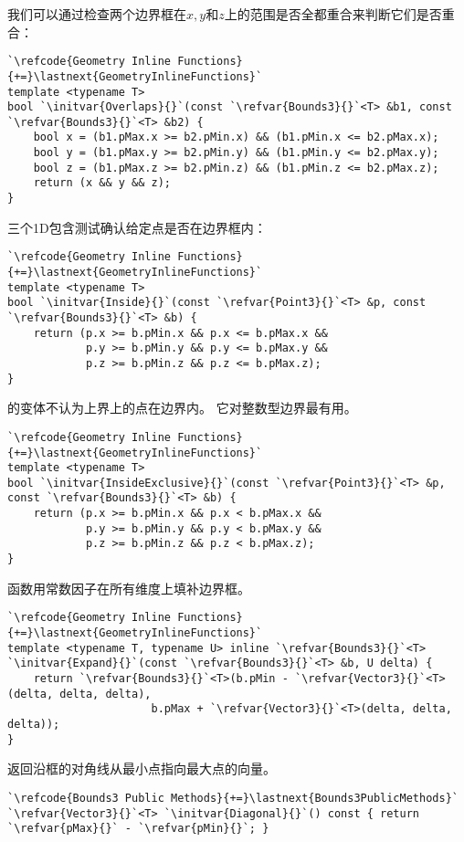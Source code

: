 我们可以通过检查两个边界框在$x,y$和$z$上的范围是否全都重合来判断它们是否重合：
\begin{lstlisting}
`\refcode{Geometry Inline Functions}{+=}\lastnext{GeometryInlineFunctions}`
template <typename T>
bool `\initvar{Overlaps}{}`(const `\refvar{Bounds3}{}`<T> &b1, const `\refvar{Bounds3}{}`<T> &b2) {
    bool x = (b1.pMax.x >= b2.pMin.x) && (b1.pMin.x <= b2.pMax.x);
    bool y = (b1.pMax.y >= b2.pMin.y) && (b1.pMin.y <= b2.pMax.y);
    bool z = (b1.pMax.z >= b2.pMin.z) && (b1.pMin.z <= b2.pMax.z);
    return (x && y && z);
}
\end{lstlisting}

三个1D包含测试确认给定点是否在边界框内：
\begin{lstlisting}
`\refcode{Geometry Inline Functions}{+=}\lastnext{GeometryInlineFunctions}`
template <typename T>
bool `\initvar{Inside}{}`(const `\refvar{Point3}{}`<T> &p, const `\refvar{Bounds3}{}`<T> &b) {
    return (p.x >= b.pMin.x && p.x <= b.pMax.x &&
            p.y >= b.pMin.y && p.y <= b.pMax.y &&
            p.z >= b.pMin.z && p.z <= b.pMax.z);
}
\end{lstlisting}

的变体不认为上界上的点在边界内。
它对整数型边界最有用。
\begin{lstlisting}
`\refcode{Geometry Inline Functions}{+=}\lastnext{GeometryInlineFunctions}`
template <typename T>
bool `\initvar{InsideExclusive}{}`(const `\refvar{Point3}{}`<T> &p, const `\refvar{Bounds3}{}`<T> &b) {
    return (p.x >= b.pMin.x && p.x < b.pMax.x &&
            p.y >= b.pMin.y && p.y < b.pMax.y &&
            p.z >= b.pMin.z && p.z < b.pMax.z);
}
\end{lstlisting}

函数用常数因子在所有维度上填补边界框。
\begin{lstlisting}
`\refcode{Geometry Inline Functions}{+=}\lastnext{GeometryInlineFunctions}`
template <typename T, typename U> inline `\refvar{Bounds3}{}`<T>
`\initvar{Expand}{}`(const `\refvar{Bounds3}{}`<T> &b, U delta) {
    return `\refvar{Bounds3}{}`<T>(b.pMin - `\refvar{Vector3}{}`<T>(delta, delta, delta),
                      b.pMax + `\refvar{Vector3}{}`<T>(delta, delta, delta));
}
\end{lstlisting}

返回沿框的对角线从最小点指向最大点的向量。
\begin{lstlisting}
`\refcode{Bounds3 Public Methods}{+=}\lastnext{Bounds3PublicMethods}`
`\refvar{Vector3}{}`<T> `\initvar{Diagonal}{}`() const { return `\refvar{pMax}{}` - `\refvar{pMin}{}`; }
\end{lstlisting}


